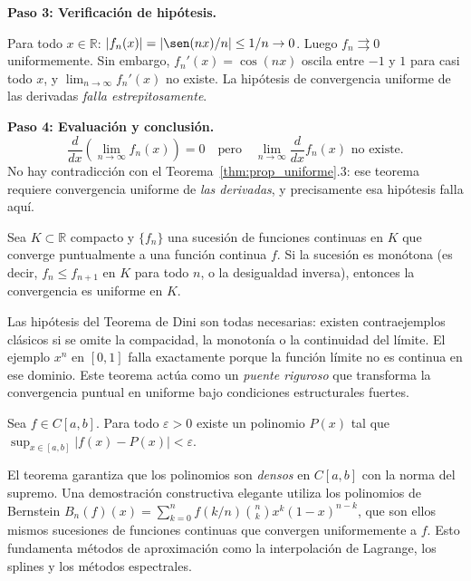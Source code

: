 \begin{example}
\begin{myproof}
\textbf{Paso 3: Verificación de hipótesis.}

Para todo $x \in \mathbb{R}$:
$|f_n(x)| = |\sen(nx)/n| \leq 1/n \to 0$.
Luego $f_n \rightrightarrows 0$ uniformemente. Sin embargo,
$f_n'(x) = \cos(nx)$ oscila entre $-1$ y $1$ para casi todo $x$,
y $\lim_{n\to\infty} f_n'(x)$ no existe. La hipótesis de convergencia
uniforme de las derivadas \emph{falla estrepitosamente}.

\textbf{Paso 4: Evaluación y conclusión.}
\[
    \boxed{\frac{d}{dx}\!\left(\lim_{n\to\infty} f_n(x)\right) = 0
    \quad \text{pero} \quad
    \lim_{n\to\infty} \frac{d}{dx}f_n(x) \text{ no existe.}}
\]
No hay contradicción con el Teorema~\ref{thm:prop_uniforme}.3: ese
teorema requiere convergencia uniforme de \emph{las derivadas}, y
precisamente esa hipótesis falla aquí.
\end{myproof}
\end{example}

\begin{theorem}
\label{thm:dini}
Sea $K \subset \mathbb{R}$ compacto y $\{f_n\}$ una sucesión de
funciones continuas en $K$ que converge puntualmente a una función
continua $f$. Si la sucesión es monótona (es decir, $f_n \leq f_{n+1}$
en $K$ para todo $n$, o la desigualdad inversa), entonces la
convergencia es uniforme en $K$.
\end{theorem}

\begin{rem}
Las hipótesis del Teorema de Dini son todas necesarias: existen
contraejemplos clásicos si se omite la compacidad, la monotonía o la
continuidad del límite. El ejemplo $x^n$ en $[0,1]$ falla exactamente
porque la función límite no es continua en ese dominio. Este teorema
actúa como un \emph{puente riguroso} que transforma la convergencia
puntual en uniforme bajo condiciones estructurales fuertes.
\end{rem}

\begin{theorem}
\label{thm:weierstrass_aprox}
Sea $f \in C[a,b]$. Para todo $\varepsilon > 0$ existe un polinomio
$P(x)$ tal que $\sup_{x\in[a,b]}|f(x) - P(x)| < \varepsilon$.
\end{theorem}

\begin{rem}
El teorema garantiza que los polinomios son \emph{densos} en $C[a,b]$
con la norma del supremo. Una demostración constructiva elegante
utiliza los polinomios de Bernstein
$B_n(f)(x) = \sum_{k=0}^n f(k/n)\binom{n}{k}x^k(1-x)^{n-k}$,
que son ellos mismos sucesiones de funciones continuas que convergen
uniformemente a $f$. Esto fundamenta métodos de aproximación como la
interpolación de Lagrange, los splines y los métodos espectrales.
\end{rem}

